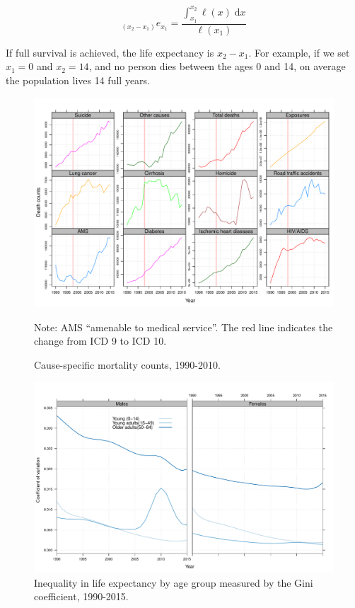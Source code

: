 \documentclass[11.5pt]{article}
\newcommand{\dd}{\; \mathrm{d}}
\begin{document}
{\begin{equation}
_{(x_2-x_1)}e_{x_1} = \frac{\int _{x_1}^{x_2} \ell(x) \dd x}{\ell(x_1)}
\end{equation}

If full survival is achieved, the life expectancy is $x_2-x_1$.  For example, if we set $x_1=0$ and $x_2=14$, and no person dies between the ages 0 and 14, on average the population lives 14 full years.



\begin{figure}
\centering
\caption{Cause-specific mortality counts, 1990-2010.}
\label{fig:ClassSens}
\includegraphics[scale=.6]{Sensitivity_fig.pdf}

Note: AMS ``amenable to medical service''. The red line indicates the change from ICD 9 to ICD 10. 
\end{figure}

\begin{figure}[h!]
\centering
\caption{Inequality in life expectancy by age group measured by the Gini coefficient, 1990-2015.}
\label{fig:Gini}
\includegraphics[scale=.5]{CVfig.pdf}
\end{figure}



}
\end{document}
